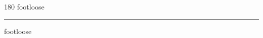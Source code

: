 
\begin{frame}
\begin{center}
\begin{turn}{180}
{\fontsize{2.5cm}{1em}\selectfont footloose}
\end{turn}
\vspace{1em}\par  
\hrule
\vspace{1em}\par  
{\fontsize{2.5cm}{1em}\selectfont footloose}
\end{center}
\end{frame}
